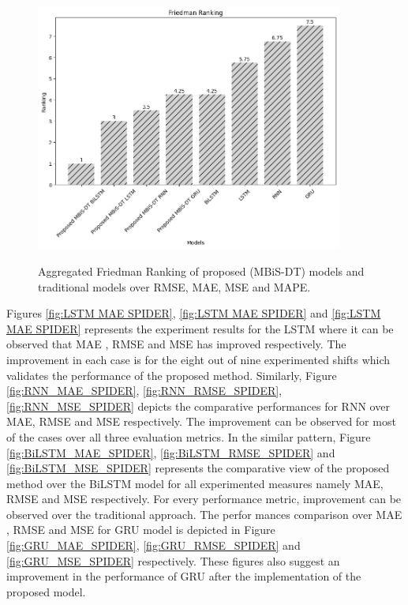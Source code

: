 \documentclass[sn-mathphys,Numbered]{sn-jnl}
\theoremstyle{thmstyleone}
\theoremstyle{thmstyletwo}
\theoremstyle{thmstylethree}
\begin{document}
\begin{figure}[ht!]
\centering
\includegraphics[width=0.9\textwidth, height=0.6\linewidth]{freidman_rank.png}
\label{fig:Friedman}
 \caption{Aggregated Friedman Ranking of proposed (MBiS-DT) models and traditional models over RMSE, MAE, MSE and MAPE.}
 \end{figure} 
\pagebreak
Figures \ref{fig:LSTM MAE SPIDER}, \ref{fig:LSTM MAE SPIDER} and \ref{fig:LSTM MAE SPIDER} represents the experiment results for the LSTM where it can be observed that MAE , RMSE and MSE has improved respectively. The improvement in each case is for the eight out of nine experimented shifts which validates the performance of the proposed method. Similarly, Figure \ref{fig:RNN_MAE_SPIDER}, \ref{fig:RNN_RMSE_SPIDER}, \ref{fig:RNN_MSE_SPIDER} depicts the comparative performances for RNN over MAE, RMSE and MSE respectively. The improvement can be observed for most of the cases over all three evaluation metrics. In the similar pattern, Figure \ref{fig:BiLSTM_MAE_SPIDER}, \ref{fig:BiLSTM_RMSE_SPIDER} and \ref{fig:BiLSTM_MSE_SPIDER} represents the comparative view of the proposed method over the BiLSTM model for all experimented measures namely MAE, RMSE and MSE respectively. For every performance metric, improvement can be observed over the traditional approach. The perfor 
 mances comparison over MAE , RMSE and MSE for GRU model is depicted in Figure \ref{fig:GRU_MAE_SPIDER}, \ref{fig:GRU_RMSE_SPIDER} and \ref{fig:GRU_MSE_SPIDER} respectively. These figures also suggest an improvement in the performance of GRU after the implementation of the proposed model.
\end{document}
